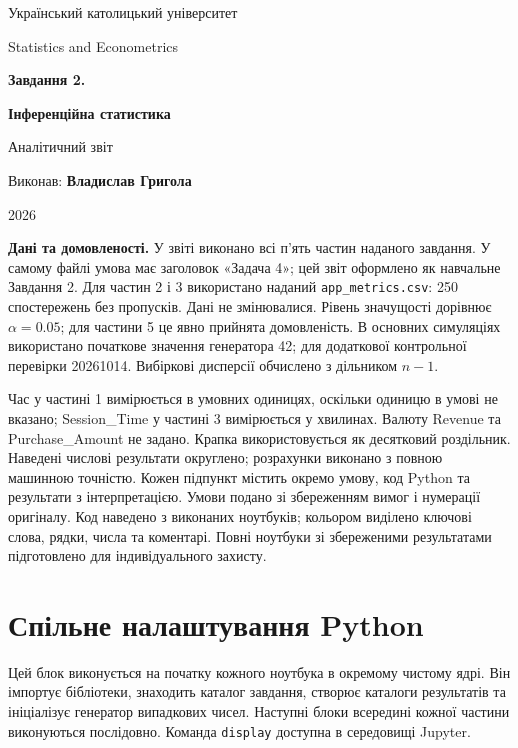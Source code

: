 \documentclass[11pt,a4paper]{article}
\newcommand{\pythoncode}[1]{%
  \Needspace{6\baselineskip}
  \begin{tcolorbox}[enhanced,breakable,colback=black!2!white,colframe=black!15!white,
    colbacktitle=black!6!white,coltitle=accent,fonttitle=\bfseries\small,
    title=Код Python,title after break={Код Python (продовження)},boxrule=0.4pt,arc=1mm,left=2mm,right=2mm,top=2mm,bottom=2mm,
    before skip=6pt,after skip=8pt]
  
  \end{tcolorbox}}
\begin{document}
\hypersetup{pageanchor=false}
\begin{titlepage}
\centering
\vspace*{14mm}
{\Large Український католицький університет\par}
\vspace{9mm}
{\large Statistics and Econometrics\par}
\vfill
{\huge\bfseries\color{accent} Завдання 2.\par}
\vspace{4mm}
{\huge\bfseries\color{accent} Інференційна статистика\par}
\vspace{10mm}
{\large Аналітичний звіт\par}
\vfill
{\large Виконав: \textbf{Владислав Григола}\par}
\vspace{22mm}
{\large 2026\par}
\end{titlepage}
\hypersetup{pageanchor=true}
\tableofcontents
\vspace{10mm}
\textbf{Дані та домовленості.}
У звіті виконано всі п’ять частин наданого завдання.
У самому файлі умова має заголовок «Задача 4»; цей звіт оформлено як навчальне Завдання 2.
Для частин 2 і 3 використано наданий \texttt{app\_metrics.csv}: 250 спостережень без пропусків.
Дані не змінювалися. Рівень значущості дорівнює $\alpha=0.05$; для частини 5 це явно прийнята домовленість.
В основних симуляціях використано початкове значення генератора 42;
для додаткової контрольної перевірки \textemdash{} 20261014.
Вибіркові дисперсії обчислено з дільником $n-1$.

Час у частині 1 вимірюється в умовних одиницях, оскільки одиницю в умові не вказано;
Session\_Time у частині 3 вимірюється у хвилинах. Валюту Revenue та Purchase\_Amount не задано.
Крапка використовується як десятковий роздільник. Наведені числові результати округлено;
розрахунки виконано з повною машинною точністю.
Кожен підпункт містить окремо умову, код Python та результати з інтерпретацією. Умови подано зі збереженням вимог і нумерації оригіналу. Код наведено з виконаних ноутбуків; кольором виділено ключові слова, рядки, числа та коментарі. Повні ноутбуки зі збереженими результатами підготовлено для індивідуального захисту.

\clearpage

\section*{Спільне налаштування Python}
Цей блок виконується на початку кожного ноутбука в окремому чистому ядрі.
Він імпортує бібліотеки, знаходить каталог завдання, створює каталоги результатів
та ініціалізує генератор випадкових чисел. Наступні блоки всередині кожної частини
виконуються послідовно. Команда \texttt{display} доступна в середовищі Jupyter.
\pythoncode{part1-cell1}
\clearpage
\end{document}
